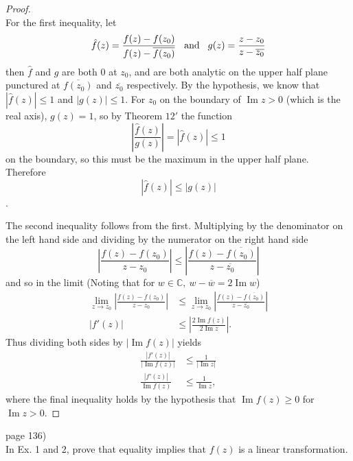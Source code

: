 \documentclass{article}
\newenvironment{problem}[2][Problem]{\begin{trivlist}
\item[\hskip \labelsep {\bfseries #1}\hskip \labelsep {\bfseries #2.}]}{\end{trivlist}}
\begin{document}
\begin{proof} \text{} \\
  For the first inequality, let \[
    \hat{f}(z) = \frac{f(z)-f(z_0)}{f(z)-\overline{f(z_0)}}
    \hspace{0.3cm}\text{and}\hspace{0.3cm}
    g(z) = \frac{z-z_0}{z - \overline{z_0}}
  \] then $\hat{f}$ and $g$ are both $0$ at $z_0$, and are both analytic on the
  upper half plane punctured at $\overline{f(z_0)}$ and $\overline{z_0}$
  respectively. By the hypothesis, we know that $|\hat{f}(z)| \leq 1$ and
  $|g(z)| \leq 1$.
  For $z_0$ on the boundary of $\operatorname{Im} z > 0$
  (which is the real axis), $g(z) = 1$, so by Theorem $12'$ the function \[
    \left|\frac{\hat{f}(z)}{g(z)}\right| = |\hat{f}(z)| \leq 1
  \] on the boundary, so this must be the maximum in the upper half plane. Therefore \[
    |\hat{f}(z)| \leq |g(z)|
  \].

  The second inequality follows from the first. Multiplying
  by the denominator on the left hand side and dividing by the numerator on the
  right hand side \[
    \left|\frac{f(z) - f(z_0)}{z - z_0}\right| \leq
    \left|\frac{f(z)-\overline{f(z_0)}}{z - \overline{z_0}}\right|
  \] and so in the limit (Noting that for
  $w \in \mathbb{C},\ w-\overline{w} = 2\operatorname{Im} w$) \begin{align*}
    \lim_{z \rightarrow z_0}\left|\frac{f(z) - f(z_0)}{z - z_0}\right| &\leq
    \lim_{z \rightarrow z_0}\left|\frac{f(z)-\overline{f(z_0)}}{z - \overline{z_0}}\right|\\
    |f'(z)| &\leq
    \left|\frac{2\operatorname{Im}f(z)}{2\operatorname{Im}z}\right|.
  \end{align*}
  Thus dividing both sides by $|\operatorname{Im} f(z)|$ yields \begin{align*}
    \frac{|f'(z)|}{|\operatorname{Im} f(z)|} &\leq \frac{1}{|\operatorname{Im} z|}\\
    \frac{|f'(z)|}{\operatorname{Im} f(z)} &\leq \frac{1}{\operatorname{Im} z},
  \end{align*} where the final inequality holds by the hypothesis that
  $\operatorname{Im} f(z) \geq 0$ for $\operatorname{Im} z > 0$.
\end{proof}
\pagebreak

\begin{problem}{3} (page 136) \\
  In Ex. 1 and 2, prove that equality implies that $f(z)$ is a linear transformation.
\end{problem}
\end{document}
